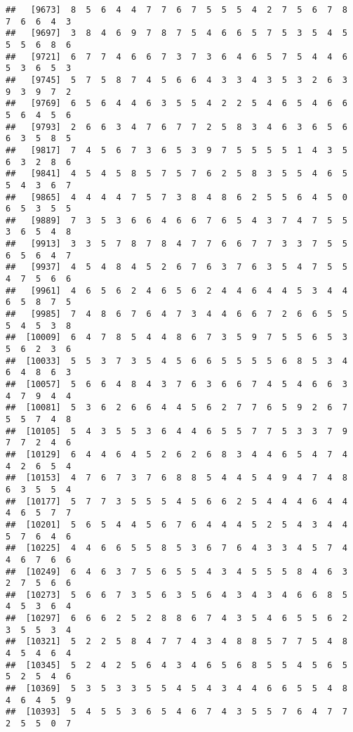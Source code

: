 \documentclass[
]{book}
\begin{document}
\begin{verbatim}
##   [9673]  8  5  6  4  4  7  7  6  7  5  5  5  4  2  7  5  6  7  8  7  6  6  4  3
##   [9697]  3  8  4  6  9  7  8  7  5  4  6  6  5  7  5  3  5  4  5  5  5  6  8  6
##   [9721]  6  7  7  4  6  6  7  3  7  3  6  4  6  5  7  5  4  4  6  5  3  6  5  3
##   [9745]  5  7  5  8  7  4  5  6  6  4  3  3  4  3  5  3  2  6  3  9  3  9  7  2
##   [9769]  6  5  6  4  4  6  3  5  5  4  2  2  5  4  6  5  4  6  6  5  6  4  5  6
##   [9793]  2  6  6  3  4  7  6  7  7  2  5  8  3  4  6  3  6  5  6  6  3  5  8  5
##   [9817]  7  4  5  6  7  3  6  5  3  9  7  5  5  5  5  1  4  3  5  6  3  2  8  6
##   [9841]  4  5  4  5  8  5  7  5  7  6  2  5  8  3  5  5  4  6  5  5  4  3  6  7
##   [9865]  4  4  4  4  7  5  7  3  8  4  8  6  2  5  5  6  4  5  0  6  5  3  5  5
##   [9889]  7  3  5  3  6  6  4  6  6  7  6  5  4  3  7  4  7  5  5  3  6  5  4  8
##   [9913]  3  3  5  7  8  7  8  4  7  7  6  6  7  7  3  3  7  5  5  6  5  6  4  7
##   [9937]  4  5  4  8  4  5  2  6  7  6  3  7  6  3  5  4  7  5  5  4  7  5  6  6
##   [9961]  4  6  5  6  2  4  6  5  6  2  4  4  6  4  4  5  3  4  4  6  5  8  7  5
##   [9985]  7  4  8  6  7  6  4  7  3  4  4  6  6  7  2  6  6  5  5  5  4  5  3  8
##  [10009]  6  4  7  8  5  4  4  8  6  7  3  5  9  7  5  5  6  5  3  5  6  2  3  6
##  [10033]  5  5  3  7  3  5  4  5  6  6  5  5  5  5  6  8  5  3  4  6  4  8  6  3
##  [10057]  5  6  6  4  8  4  3  7  6  3  6  6  7  4  5  4  6  6  3  4  7  9  4  4
##  [10081]  5  3  6  2  6  6  4  4  5  6  2  7  7  6  5  9  2  6  7  5  5  7  4  8
##  [10105]  5  4  3  5  5  3  6  4  4  6  5  5  7  7  5  3  3  7  9  7  7  2  4  6
##  [10129]  6  4  4  6  4  5  2  6  2  6  8  3  4  4  6  5  4  7  4  4  2  6  5  4
##  [10153]  4  7  6  7  3  7  6  8  8  5  4  4  5  4  9  4  7  4  8  6  3  5  5  4
##  [10177]  5  7  7  3  5  5  5  4  5  6  6  2  5  4  4  4  6  4  4  4  6  5  7  7
##  [10201]  5  6  5  4  4  5  6  7  6  4  4  4  5  2  5  4  3  4  4  5  7  6  4  6
##  [10225]  4  4  6  6  5  5  8  5  3  6  7  6  4  3  3  4  5  7  4  4  6  7  6  6
##  [10249]  6  4  6  3  7  5  6  5  5  4  3  4  5  5  5  8  4  6  3  2  7  5  6  6
##  [10273]  5  6  6  7  3  5  6  3  5  6  4  3  4  3  4  6  6  8  5  4  5  3  6  4
##  [10297]  6  6  6  2  5  2  8  8  6  7  4  3  5  4  6  5  5  6  2  3  5  5  3  4
##  [10321]  5  2  2  5  8  4  7  7  4  3  4  8  8  5  7  7  5  4  8  4  5  4  6  4
##  [10345]  5  2  4  2  5  6  4  3  4  6  5  6  8  5  5  4  5  6  5  5  2  5  4  6
##  [10369]  5  3  5  3  3  5  5  4  5  4  3  4  4  6  6  5  5  4  8  4  6  4  5  9
##  [10393]  5  4  5  5  3  6  5  4  6  7  4  3  5  5  7  6  4  7  7  2  5  5  0  7

\end{verbatim}
\end{document}
